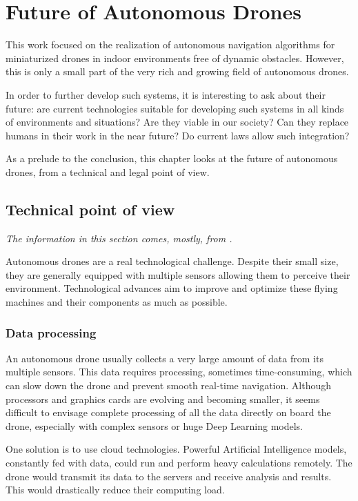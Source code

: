 \chapter{Future of Autonomous Drones}\label{ch:future.autonomous.drones}

This work focused on the realization of autonomous navigation algorithms for miniaturized drones in indoor environments free of dynamic obstacles. However, this is only a small part of the very rich and growing field of autonomous drones.

In order to further develop such systems, it is interesting to ask about their future: are current technologies suitable for developing such systems in all kinds of environments and situations? Are they viable in our society? Can they replace humans in their work in the near future? Do current laws allow such integration?

As a prelude to the conclusion, this chapter looks at the future of autonomous drones, from a technical and legal point of view.

\section{Technical point of view}

\emph{The information in this section comes, mostly, from \cite{floreano2015science}.}

Autonomous drones are a real technological challenge. Despite their small size, they are generally equipped with multiple sensors allowing them to perceive their environment. Technological advances aim to improve and optimize these flying machines and their components as much as possible.

\subsection{Data processing}

An autonomous drone usually collects a very large amount of data from its multiple sensors. This data requires processing, sometimes time-consuming, which can slow down the drone and prevent smooth real-time navigation. Although processors and graphics cards are evolving and becoming smaller, it seems difficult to envisage complete processing of all the data directly on board the drone, especially with complex sensors or huge Deep Learning models.

One solution is to use cloud technologies. Powerful Artificial Intelligence models, constantly fed with data, could run and perform heavy calculations remotely. The drone would transmit its data to the servers and receive analysis and results. This would drastically reduce their computing load.

